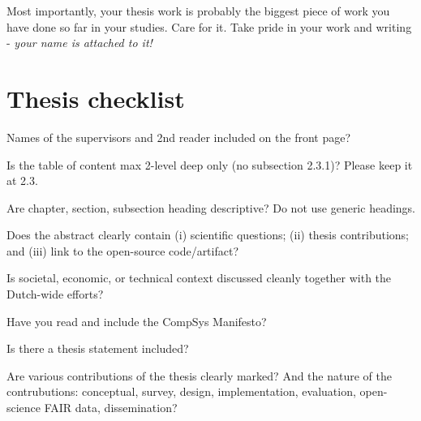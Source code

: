 Most importantly, your thesis work is probably the biggest piece of work you have done so far in your studies. 
Care for it. Take pride in your work and writing - \textit{your name is attached to it!} 


\newpage 
\section*{Thesis checklist}
  \begin{todolist}[leftmargin=10pt,itemindent=0em,nolistsep]
    \item Names of the supervisors and 2nd reader included on the front page?   
    \item Is the table of content max 2-level deep only (no subsection 2.3.1)? Please keep it at 2.3. 
    \item Are chapter, section, subsection heading descriptive? Do not use generic headings. 
    \item Does the abstract clearly contain (i) scientific questions; (ii) thesis contributions; and (iii) link to the open-source code/artifact?
    \item Is societal, economic, or technical context discussed cleanly together with the Dutch-wide efforts? 
    \begin{todolist}[leftmargin=10pt,itemindent=0em,nolistsep]
      \item Have you read and include the CompSys Manifesto?      
    \end{todolist}
    \item Is there a thesis statement included?
    \item Are various contributions of the thesis clearly marked? And the nature of the contrubutions: conceptual, survey, design, implementation, evaluation, open-science FAIR data, dissemination?
    
  \end{todolist}
